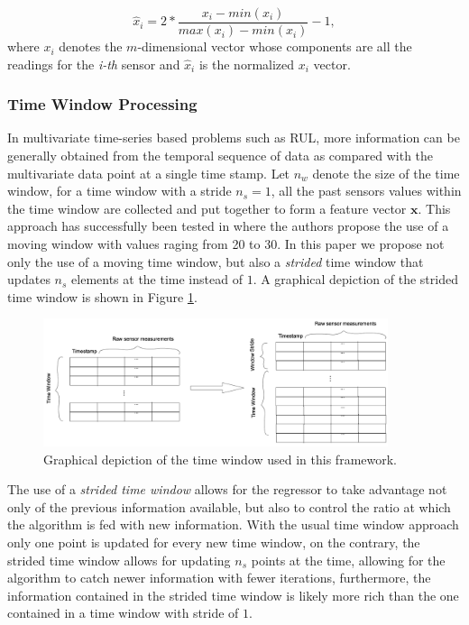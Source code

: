 \documentclass{article}
\begin{document}
\begin{equation}
\hat{x}_i = 2* \frac{x_i - min(x_i)}{max(x_i) - min(x_i)} - 1,
\label{eq:min_max_norm}
\end{equation}
where $x_i$ denotes the $m$-dimensional vector whose components are all the readings for the \textit{i-th} sensor and $\hat{x}_i$ is the normalized $x_i$ vector.

\subsubsection{Time Window Processing}

In multivariate time-series based problems such as RUL, more information can be generally obtained from the temporal sequence of data as compared with the multivariate data point at a single time stamp. Let $n_w$ denote the size of the time window, for a time window with a stride $n_s = 1$, all the past sensors values within the time window are collected and put together to form a feature vector $\mathbf{x}$. This approach has successfully been tested in \cite{Li2018, Lim2016} where the authors propose the use of a moving window with values raging from 20 to 30. In this paper we propose not only the use of a moving time window, but also a \textit{strided} time window that updates $n_s$ elements at the time instead of $1$. A graphical depiction of the strided time window is shown in Figure \ref{fig:time_window}.

\begin{figure}[!htb]
\centering
\includegraphics[width=0.9\textwidth]{../img/time_window.png}
\caption{Graphical depiction of the time window used in this framework.}
\label{fig:time_window}
\end{figure}

The use of a \textit{strided time window} allows for the regressor to take advantage not only of the previous information available, but also to control the ratio at which the algorithm is fed with new information. With the usual time window approach only one point is updated for every new time window, on the contrary, the strided time window allows for updating $n_s$ points at the time, allowing for the algorithm to catch newer information with fewer iterations, furthermore, the information contained in the strided time window is likely more rich than the one contained in a time window with stride of $1$.
\end{document}

